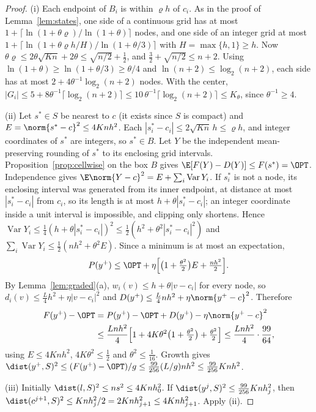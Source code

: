 \begin{proof}
(i) Each endpoint of $B_i$ is within $\varrho h$ of $c_i$. As in the proof of
Lemma~\ref{lem:states}, one side of a continuous grid has at most
$1+\lceil\ln(1+\theta\varrho)/\ln(1+\theta)\rceil$ nodes, and one side of an
integer grid at most $1+\lceil\ln(1+\theta\varrho h/H)/\ln(1+\theta/3)\rceil$
with $H=\max\{h,1\}\ge h$. Now
$\theta\varrho\le2\theta\sqrt{Kn}+2\theta\le\sqrt{n/2}+\frac12$, and
$\frac32+\sqrt{n/2}\le n+2$. Using $\ln(1+\theta)\ge\ln(1+\theta/3)\ge\theta/4$
and $\ln(n+2)\le\log_2(n+2)$, each side has at most
$2+4\theta^{-1}\log_2(n+2)$ nodes. With the center, $|G_i|\le5+8\theta^{-1}
\lceil\log_2(n+2)\rceil\le10\,\theta^{-1}\lceil\log_2(n+2)\rceil\le K_\theta$,
since $\theta^{-1}\ge4$.

(ii) Let $s^*\in S$ be nearest to $c$ (it exists since $S$ is compact) and
$E=\norm{s^*-c}^2\le4Knh^2$. Each $|s^*_i-c_i|\le2\sqrt{Kn}\,h\le\varrho h$,
and integer coordinates of $s^*$ are integers, so $s^*\in B$. Let $Y$ be the
independent mean-preserving rounding of $s^*$ to its enclosing grid
intervals. Proposition~\ref{prop:cellwise} on the box $B$ gives
$\E[F(Y)-D(Y)]\le F(s^*)=\OPT$. Independence gives
$\E\norm{Y-c}^2=E+\sum_i\operatorname{Var}Y_i$. If $s^*_i$ is not a node, its
enclosing interval was generated from its inner endpoint, at distance at most
$|s^*_i-c_i|$ from $c_i$, so its length is at most $h+\theta|s^*_i-c_i|$;
an integer coordinate inside a unit interval is impossible, and clipping only
shortens. Hence
$\operatorname{Var}Y_i\le\frac14(h+\theta|s^*_i-c_i|)^2\le\frac12(h^2+\theta^2|s^*_i-c_i|^2)$
and $\sum_i\operatorname{Var}Y_i\le\frac12(nh^2+\theta^2E)$. Since a minimum
is at most an expectation,
\[
P(y^+)\le\OPT+\eta\Bigl[\bigl(1+\tfrac{\theta^2}2\bigr)E+\tfrac{nh^2}2\Bigr].
\]
By Lemma~\ref{lem:graded}(a), $w_i(v)\le h+\theta|v-c_i|$ for every node, so
$d_i(v)\le\frac L4h^2+\eta|v-c_i|^2$ and
$D(y^+)\le\frac L4nh^2+\eta\norm{y^+-c}^2$. Therefore
\begin{align*}
F(y^+)-\OPT&=P(y^+)-\OPT+D(y^+)-\eta\norm{y^+-c}^2\\
&\le\frac{Lnh^2}4\Bigl[1+4K\theta^2\bigl(1+\tfrac{\theta^2}2\bigr)+\tfrac{\theta^2}2\Bigr]
\le\frac{Lnh^2}4\cdot\frac{99}{64},
\end{align*}
using $E\le4Knh^2$, $4K\theta^2\le\frac12$ and $\theta^2\le\frac1{16}$.
Growth gives $\dist(y^+,S)^2\le(F(y^+)-\OPT)/g\le\frac{99}{256}(L/g)nh^2\le
\frac{99}{256}Knh^2$.

(iii) Initially $\dist(l,S)^2\le ns^2\le4Knh_0^2$. If
$\dist(y^j,S)^2\le\frac{99}{256}Knh_j^2$, then
$\dist(c^{j+1},S)^2\le Knh_j^2/2=2Knh_{j+1}^2\le4Knh_{j+1}^2$. Apply (ii).


\end{proof}
